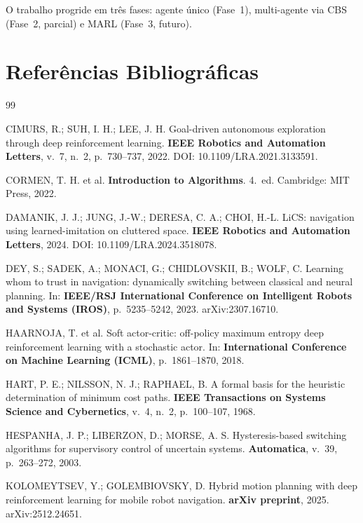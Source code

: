 \documentclass[12pt, a4paper]{article}
\begin{document}
O trabalho progride em três fases: agente único (Fase~1), multi-agente via CBS (Fase~2,
parcial) e MARL (Fase~3, futuro).

\renewcommand{\refname}{}
\section*{Referências Bibliográficas}

\begin{thebibliography}{99}
\setlength{\itemsep}{6pt}
\setlength{\parskip}{2pt}
\small

CIMURS, R.; SUH, I. H.; LEE, J. H. Goal-driven autonomous exploration through deep
reinforcement learning. \textbf{IEEE Robotics and Automation Letters}, v.~7, n.~2,
p.~730--737, 2022. DOI: 10.1109/LRA.2021.3133591.

CORMEN, T. H. et al. \textbf{Introduction to Algorithms}. 4.\ ed. Cambridge: MIT Press, 2022.

DAMANIK, J. J.; JUNG, J.-W.; DERESA, C. A.; CHOI, H.-L. LiCS: navigation using
learned-imitation on cluttered space. \textbf{IEEE Robotics and Automation Letters}, 2024.
DOI: 10.1109/LRA.2024.3518078.

DEY, S.; SADEK, A.; MONACI, G.; CHIDLOVSKII, B.; WOLF, C. Learning whom to trust in
navigation: dynamically switching between classical and neural planning. In:
\textbf{IEEE/RSJ International Conference on Intelligent Robots and Systems (IROS)}, p.~5235--5242,
2023. arXiv:2307.16710.

HAARNOJA, T. et al. Soft actor-critic: off-policy maximum entropy deep reinforcement learning
with a stochastic actor. In: \textbf{International Conference on Machine Learning (ICML)},
p.~1861--1870, 2018.

HART, P. E.; NILSSON, N. J.; RAPHAEL, B. A formal basis for the heuristic determination of
minimum cost paths. \textbf{IEEE Transactions on Systems Science and Cybernetics}, v.~4,
n.~2, p.~100--107, 1968.

HESPANHA, J. P.; LIBERZON, D.; MORSE, A. S. Hysteresis-based switching algorithms for
supervisory control of uncertain systems. \textbf{Automatica}, v.~39, p.~263--272, 2003.

KOLOMEYTSEV, Y.; GOLEMBIOVSKY, D. Hybrid motion planning with deep reinforcement learning
for mobile robot navigation. \textbf{arXiv preprint}, 2025. arXiv:2512.24651.


\end{thebibliography}
\end{document}

